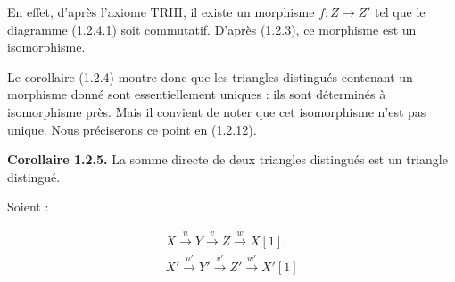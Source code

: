 En effet, d'après l'axiome TRIII, il existe un morphisme
$f\colon Z\longrightarrow Z'$ tel que le diagramme (1.2.4.1) soit
commutatif. D'après (1.2.3), ce morphisme est un isomorphisme.

Le corollaire (1.2.4) montre donc que les triangles distingués contenant un
morphisme donné sont essentiellement uniques : ils sont déterminés à
isomorphisme près. Mais il convient de noter que cet isomorphisme n'est pas
unique. Nous préciserons ce point en (1.2.12).

\medskip
\noindent\textbf{Corollaire 1.2.5.}\quad
La somme directe de deux triangles distingués est un triangle distingué.

Soient :

\[
  \begin{gathered}
    X\xrightarrow{u}Y\xrightarrow{v}Z\xrightarrow{w}X[1],\\
    X'\xrightarrow{u'}Y'\xrightarrow{v'}Z'\xrightarrow{w'}X'[1]
  \end{gathered}
\]
\endgroup
